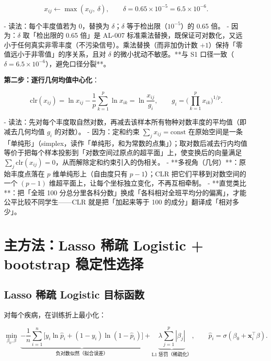 \documentclass{internal-report}
\begin{document}
\begin{equation}
  x_{ij} \leftarrow \max(x_{ij},\ \delta),
  \qquad
  \delta = 0.65 \times 10^{-5} = 6.5\times10^{-6}.
  \label{eq:zeroreplace}
\end{equation}

- 读法：每个丰度值若为 0，替换为 $\delta$；$\delta$ 等于检出限（$10^{-5}$）的 0.65 倍。
- 因为：$\delta$ 取「检出限的 0.65 倍」是 AL-007 标准乘法替换，既保证可对数化，又远小于任何真实非零丰度（不污染信号）。乘法替换（而非加伪计数 $+1$）保持「零值远小于非零值」的序关系，且对 $\delta$ 的微小扰动不敏感。**与 S1 口径一致（$\delta=6.5\times10^{-6}$），避免口径分裂**。

\textbf{第二步：逐行几何均值中心化}：

\begin{equation}
  \mathrm{clr}(x_{ij}) = \ln x_{ij} - \frac{1}{p}\sum_{k=1}^{p}\ln x_{ik}
  = \ln\frac{x_{ij}}{g_i},
  \qquad
  g_i = \Big(\prod_{k=1}^{p} x_{ik}\Big)^{1/p}.
  \label{eq:clr}
\end{equation}

- 读法：先对每个丰度取自然对数，再减去该样本所有物种对数丰度的平均值（即减去几何均值 $g_i$ 的对数）。
- 因为：定和约束 $\sum_j x_{ij} = \text{const}$ 在原始空间是一条「单纯形」（simplex，读作「单纯形，和为常数的点集」）；取对数后减去行内均值等价于把每个样本投影到「对数空间过原点的超平面」上，使变换后的向量满足 $\sum_j \mathrm{clr}(x_{ij})=0$，从而解除定和约束引入的伪相关。
- **多视角（几何）**：原始丰度点落在 $p$ 维单纯形上（自由度只有 $p-1$）；CLR 把它们平移到对数空间的一个 $(p-1)$ 维超平面上，让每个坐标独立变化，不再互相牵制。
- **直觉类比**：把「全班 100 分总分里各科分数」换成「各科相对全班平均分的偏离」，才能公平比较不同学生——CLR 就是把「加起来等于 100 的成分」翻译成「相对多少」。

\section{主方法：Lasso 稀疏 Logistic + bootstrap 稳定性选择}

\subsection{Lasso 稀疏 Logistic 目标函数}
\label{sec:lasso}

对每个疾病，在训练折上最小化：

\begin{equation}
  \min_{\beta_0,\beta}\
  \underbrace{-\frac{1}{n}\sum_{i=1}^{n}\Big[y_i\ln\hat{p}_i + (1-y_i)\ln(1-\hat{p}_i)\Big]}_{\text{负对数似然（拟合误差）}}
  + \underbrace{\lambda\sum_{j=1}^{p}|\beta_j|}_{\text{L1 惩罚（稀疏化）}},
  \qquad
  \hat{p}_i = \sigma(\beta_0 + \mathbf{x}_i^{\top}\beta).
  \label{eq:lasso}
\end{equation}
\end{document}

